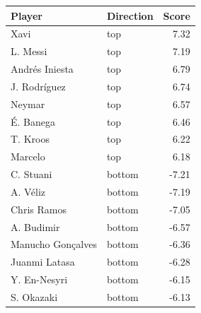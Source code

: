 
\begin{tabular}{llr}
\toprule
Player & Direction & Score\\
\midrule
Xavi & top & 7.32\\
L. Messi & top & 7.19\\
Andrés Iniesta & top & 6.79\\
J. Rodríguez & top & 6.74\\
Neymar & top & 6.57\\
É. Banega & top & 6.46\\
T. Kroos & top & 6.22\\
Marcelo & top & 6.18\\
C. Stuani & bottom & -7.21\\
A. Véliz & bottom & -7.19\\
Chris Ramos & bottom & -7.05\\
A. Budimir & bottom & -6.57\\
Manucho Gonçalves & bottom & -6.36\\
Juanmi Latasa & bottom & -6.28\\
Y. En-Nesyri & bottom & -6.15\\
S. Okazaki & bottom & -6.13\\
\bottomrule
\end{tabular}
